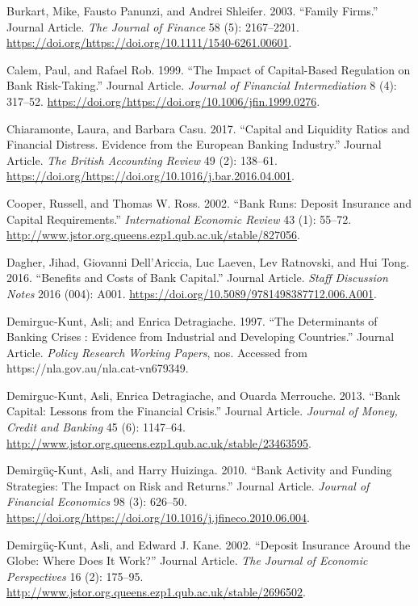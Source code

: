 \documentclass{article}
\begin{document}
\leavevmode\hypertarget{ref-RN33}{}%
Burkart, Mike, Fausto Panunzi, and Andrei Shleifer. 2003. ``Family
Firms.'' Journal Article. \emph{The Journal of Finance} 58 (5):
2167--2201.
\url{https://doi.org/https://doi.org/10.1111/1540-6261.00601}.

\leavevmode\hypertarget{ref-RN35}{}%
Calem, Paul, and Rafael Rob. 1999. ``The Impact of Capital-Based
Regulation on Bank Risk-Taking.'' Journal Article. \emph{Journal of
Financial Intermediation} 8 (4): 317--52.
\url{https://doi.org/https://doi.org/10.1006/jfin.1999.0276}.

\leavevmode\hypertarget{ref-RN36}{}%
Chiaramonte, Laura, and Barbara Casu. 2017. ``Capital and Liquidity
Ratios and Financial Distress. Evidence from the European Banking
Industry.'' Journal Article. \emph{The British Accounting Review} 49
(2): 138--61.
\url{https://doi.org/https://doi.org/10.1016/j.bar.2016.04.001}.

\leavevmode\hypertarget{ref-RN37}{}%
Cooper, Russell, and Thomas W. Ross. 2002. ``Bank Runs: Deposit
Insurance and Capital Requirements.'' \emph{International Economic
Review} 43 (1): 55--72.
\url{http://www.jstor.org.queens.ezp1.qub.ac.uk/stable/827056}.

\leavevmode\hypertarget{ref-RN40}{}%
Dagher, Jihad, Giovanni Dell'Ariccia, Luc Laeven, Lev Ratnovski, and Hui
Tong. 2016. ``Benefits and Costs of Bank Capital.'' Journal Article.
\emph{Staff Discussion Notes} 2016 (004): A001.
\url{https://doi.org/10.5089/9781498387712.006.A001}.

\leavevmode\hypertarget{ref-RN41}{}%
Demirguc-Kunt, Asli; and Enrica Detragiache. 1997. ``The Determinants of
Banking Crises : Evidence from Industrial and Developing Countries.''
Journal Article. \emph{Policy Research Working Papers}, nos. Accessed
from https://nla.gov.au/nla.cat-vn679349.

\leavevmode\hypertarget{ref-RN42}{}%
Demirguc-Kunt, Asli, Enrica Detragiache, and Ouarda Merrouche. 2013.
``Bank Capital: Lessons from the Financial Crisis.'' Journal Article.
\emph{Journal of Money, Credit and Banking} 45 (6): 1147--64.
\url{http://www.jstor.org.queens.ezp1.qub.ac.uk/stable/23463595}.

\leavevmode\hypertarget{ref-RN43}{}%
Demirgüç-Kunt, Asli, and Harry Huizinga. 2010. ``Bank Activity and
Funding Strategies: The Impact on Risk and Returns.'' Journal Article.
\emph{Journal of Financial Economics} 98 (3): 626--50.
\url{https://doi.org/https://doi.org/10.1016/j.jfineco.2010.06.004}.

\leavevmode\hypertarget{ref-RN44}{}%
Demirgüç-Kunt, Asli, and Edward J. Kane. 2002. ``Deposit Insurance
Around the Globe: Where Does It Work?'' Journal Article. \emph{The
Journal of Economic Perspectives} 16 (2): 175--95.
\url{http://www.jstor.org.queens.ezp1.qub.ac.uk/stable/2696502}.
\end{document}
